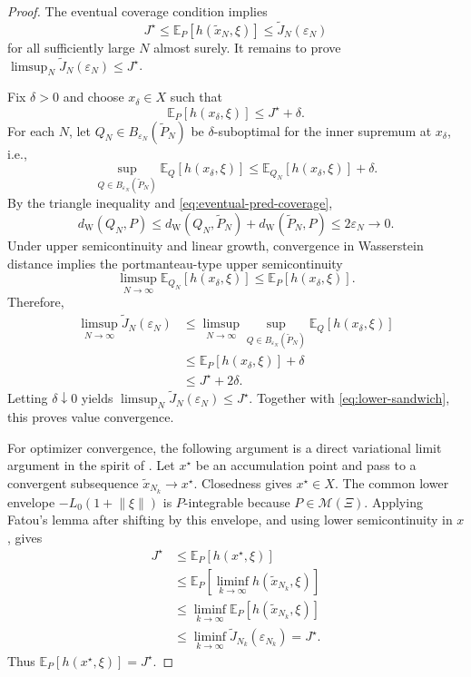 \documentclass[11pt]{article}
\newcommand{\E}{\mathbb{E}}
\newcommand{\cM}{\mathcal{M}}
\newcommand{\XiSet}{\Xi}
\newcommand{\1}{\mathbf{1}}
\newcommand{\dW}{d_{\mathrm W}}
\newcommand{\Ptil}{\widetilde P_N}
\newcommand{\norm}[1]{\left\lVert #1\right\rVert}
\begin{document}
\begin{proof}
The eventual coverage condition implies
\begin{equation}\label{eq:lower-sandwich}
J^\star\le \E_P[h(\widetilde x_N,\xi)]\le \widetilde J_N(\varepsilon_N)
\end{equation}
for all sufficiently large $N$ almost surely. It remains to prove $\limsup_N\widetilde J_N(\varepsilon_N)\le J^\star$.

Fix $\delta>0$ and choose $x_\delta\in X$ such that
\begin{equation}
    \E_P[h(x_\delta,\xi)]\le J^\star+\delta.
\end{equation}
For each $N$, let $Q_N\in B_{\varepsilon_N}(\Ptil)$ be $\delta$-suboptimal for the inner supremum at $x_\delta$, i.e.,
\begin{equation}
\sup_{Q\in B_{\varepsilon_N}(\Ptil)}\E_Q[h(x_\delta,\xi)]\le \E_{Q_N}[h(x_\delta,\xi)]+\delta.
\end{equation}
By the triangle inequality and \eqref{eq:eventual-pred-coverage},
\begin{equation}
    \dW(Q_N,P)\le \dW(Q_N,\Ptil)+\dW(\Ptil,P)\le2\varepsilon_N\to0.
\end{equation}
Under upper semicontinuity and linear growth, convergence in Wasserstein distance implies the portmanteau-type upper semicontinuity
\begin{equation}
    \limsup_{N\to\infty}\E_{Q_N}[h(x_\delta,\xi)]\le \E_P[h(x_\delta,\xi)].
\end{equation}
Therefore,
\begin{align*}
\limsup_{N\to\infty}\widetilde J_N(\varepsilon_N)
&\le \limsup_{N\to\infty}\sup_{Q\in B_{\varepsilon_N}(\Ptil)}\E_Q[h(x_\delta,\xi)]\\
&\le \E_P[h(x_\delta,\xi)]+\delta\\
&\le J^\star+2\delta.
\end{align*}
Letting $\delta\downarrow0$ yields $\limsup_N\widetilde J_N(\varepsilon_N)\le J^\star$. Together with \eqref{eq:lower-sandwich}, this proves value convergence.

For optimizer convergence, the following argument is a direct variational limit argument in the spirit of \citet{rockafellar1998variational}. Let $x^\star$ be an accumulation point and pass to a convergent subsequence $\widetilde x_{N_k}\to x^\star$. Closedness gives $x^\star\in X$. The common lower envelope $-L_0(1+\norm{\xi})$ is $P$-integrable because $P\in\cM(\XiSet)$. Applying Fatou's lemma after shifting by this envelope, and using lower semicontinuity in $x$, gives
\begin{align*}
J^\star
&\le \E_P[h(x^\star,\xi)]\\
&\le \E_P\left[\liminf_{k\to\infty}h(\widetilde x_{N_k},\xi)\right]\\
&\le \liminf_{k\to\infty}\E_P[h(\widetilde x_{N_k},\xi)]\\
&\le \liminf_{k\to\infty}\widetilde J_{N_k}(\varepsilon_{N_k})=J^\star.
\end{align*}
Thus $\E_P[h(x^\star,\xi)]=J^\star$.
\end{proof}
\end{document}
